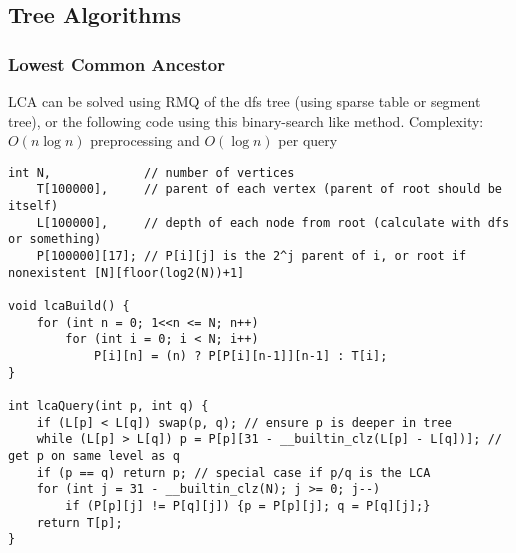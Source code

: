 \documentclass[letterpaper]{article}
\begin{document}
\subsection{Tree Algorithms}

\subsubsection{Lowest Common Ancestor}

LCA can be solved using RMQ of the dfs tree (using sparse table or segment tree), or the following code using this binary-search like method. Complexity: $O\left(n\log n\right)$ preprocessing and $O\left(\log n\right)$ per query

\begin{lstlisting}
int N,             // number of vertices
    T[100000],     // parent of each vertex (parent of root should be itself)
	L[100000],     // depth of each node from root (calculate with dfs or something)
	P[100000][17]; // P[i][j] is the 2^j parent of i, or root if nonexistent [N][floor(log2(N))+1]

void lcaBuild() {
	for (int n = 0; 1<<n <= N; n++)
		for (int i = 0; i < N; i++)
			P[i][n] = (n) ? P[P[i][n-1]][n-1] : T[i];
}

int lcaQuery(int p, int q) {
	if (L[p] < L[q]) swap(p, q); // ensure p is deeper in tree
	while (L[p] > L[q]) p = P[p][31 - __builtin_clz(L[p] - L[q])]; // get p on same level as q
	if (p == q) return p; // special case if p/q is the LCA
	for (int j = 31 - __builtin_clz(N); j >= 0; j--)
		if (P[p][j] != P[q][j]) {p = P[p][j]; q = P[q][j];}
	return T[p];
}
\end{lstlisting}
\end{document}
